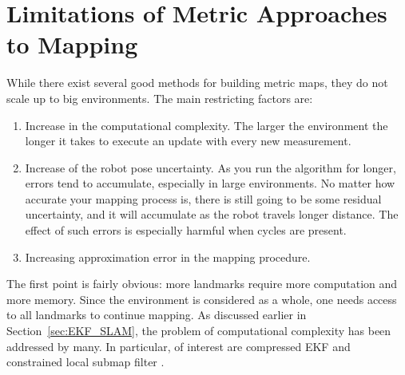 \section{Limitations of Metric Approaches to Mapping}


While there exist several good methods for building metric maps, they
do not scale up to big environments. The main restricting factors are:

\begin{enumerate}
 \item Increase in the computational complexity. The larger the
  environment the longer it takes to execute an update with every new
  measurement.

 \item Increase of the robot pose uncertainty. As you run the
   algorithm for longer, errors tend to accumulate, especially in
   large environments. No matter how accurate your mapping process is,
   there is still going to be some residual uncertainty, and it will
   accumulate as the robot travels longer distance. The effect of such
   errors is especially harmful when cycles are present.

 \item Increasing approximation error in the mapping procedure.

\end{enumerate}

The first point is fairly obvious: more landmarks require more
computation and more memory. Since the environment is considered as a
whole, one needs access to all landmarks to continue mapping. As
discussed earlier in Section~\ref{sec:EKF_SLAM}, the problem of
computational complexity has been addressed by many. In particular, of
interest are compressed EKF \cite{guivant02} and constrained local submap
filter \cite{williams:acra2001}.


 
